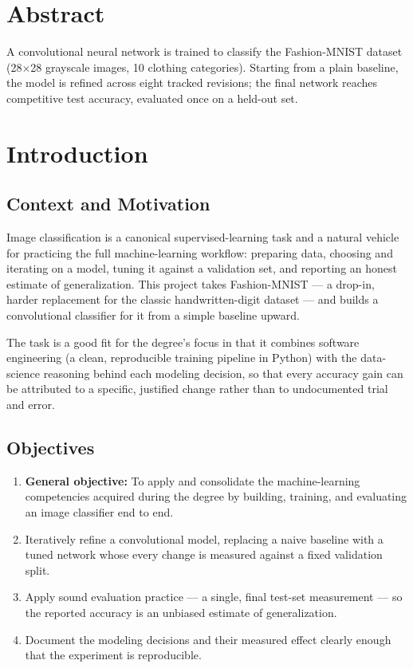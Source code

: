 \documentclass[11pt,a4paper]{report}
\begin{document}
\utadtitlepage
\utadcontents

\chapter{Abstract}
\begin{utadnote}[Summary]
A convolutional neural network is trained to classify the Fashion-MNIST
dataset (28$\times$28 grayscale images, 10 clothing categories). Starting
from a plain baseline, the model is refined across eight tracked revisions;
the final network reaches competitive test accuracy, evaluated once on a
held-out set.
\end{utadnote}

\chapter{Introduction}

\section{Context and Motivation}
Image classification is a canonical supervised-learning task and a natural
vehicle for practicing the full machine-learning workflow: preparing data,
choosing and iterating on a model, tuning it against a validation set, and
reporting an honest estimate of generalization. This project takes
Fashion-MNIST --- a drop-in, harder replacement for the classic
handwritten-digit dataset --- and builds a convolutional classifier for it
from a simple baseline upward.

The task is a good fit for the degree's focus in that it combines software
engineering (a clean, reproducible training pipeline in Python) with the
data-science reasoning behind each modeling decision, so that every
accuracy gain can be attributed to a specific, justified change rather than
to undocumented trial and error.

\section{Objectives}
\begin{enumerate}
\item \textbf{General objective:} To apply and consolidate the
  machine-learning competencies acquired during the degree by building,
  training, and evaluating an image classifier end to end.
\item Iteratively refine a convolutional model, replacing a naive baseline
  with a tuned network whose every change is measured against a fixed
  validation split.
\item Apply sound evaluation practice --- a single, final test-set
  measurement --- so the reported accuracy is an unbiased estimate of
  generalization.
\item Document the modeling decisions and their measured effect clearly
  enough that the experiment is reproducible.
\end{enumerate}
\end{document}

